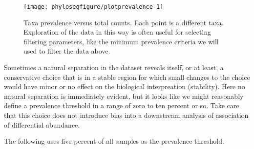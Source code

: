 \begin{knitrout}
\color{fgcolor}
\end{knitrout}
\begin{figure}
\texttt{[image: phyloseqfigure/plotprevalence-1]}
\caption{Taxa prevalence versus total counts. Each point is a different taxa. Exploration of the data in this way is often useful for selecting filtering parameters, like the minimum prevalence criteria we will used to filter the data above.}
\end{figure}
Sometimes a natural separation in the dataset reveals itself,
or at least, a conservative choice that is in a stable region
for which small changes to the choice would have
minor or no effect on the biological interpreation (stability).
Here no natural separation is immediately evident,
but it looks like we might reasonably define a prevalence threshold
in a range of zero to ten percent or so.
Take care that this choice does not introduce bias
into a downstream analysis of association of differential abundance.

The following uses five percent of all samples
as the prevalence threshold.

